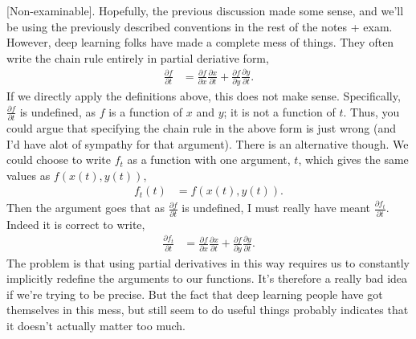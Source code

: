\documentclass{article}
\newcommand{\dd}[2][]{\frac{\partial #1}{\partial #2}}
\begin{document}
[Non-examinable]. 
Hopefully, the previous discussion made some sense, and we'll be using the previously described conventions in the rest of the notes + exam.
However, deep learning folks have made a complete mess of things.
They often write the chain rule entirely in partial deriative form,
\begin{align}
  \dd[f]{t} &= \dd[f]{x} \dd[x]{t} + \dd[f]{y} \dd[y]{t}.
\end{align}
If we directly apply the definitions above, this does not make sense. 
Specifically, $\dd[f]{t}$ is undefined, as $f$ is a function of $x$ and $y$; it is not a function of $t$.
Thus, you could argue that specifying the chain rule in the above form is just wrong (and I'd have alot of sympathy for that argument).
There is an alternative though. 
We could choose to write $f_t$ as a function with one argument, $t$, which gives the same values as $f(x(t), y(t))$,
\begin{align}
  f_t(t) &= f(x(t), y(t)).
\end{align}
Then the argument goes that as $\dd[f]{t}$ is undefined, I must really have meant $\dd[f_t]{t}$.
Indeed it is correct to write,
\begin{align}
  \dd[f_t]{t} &= \dd[f]{x} \dd[x]{t} + \dd[f]{y} \dd[y]{t}.
\end{align}
The problem is that using partial derivatives in this way requires us to constantly implicitly redefine the arguments to our functions. 
It's therefore a really bad idea if we're trying to be precise.
But the fact that deep learning people have got themselves in this mess, but still seem to do useful things probably indicates that it doesn't actually matter too much.
\end{document}
